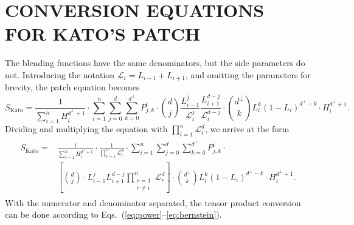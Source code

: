 \documentclass[9pt,academicons]{article}
\begin{document}
\section{CONVERSION EQUATIONS FOR KATO'S PATCH}
\label{app:kato}
The blending functions have the same denominators, but the side parameters do not.
Introducing the notation $\mathcal{L}_i=L_{i-1}+L_{i+1}$, and omitting the
parameters for brevity, the patch equation becomes
\begin{equation}
  S_\mathrm{Kato}=
  \frac{1}{\sum_{i=1}^nH_i^{d^\perp+1}}\cdot
  \sum_{i=1}^n\sum_{j=0}^d\sum_{k=0}^{d^\perp}
  P_{j,k}^i\cdot
  {d\choose j}\frac{L_{i-1}^j}{\mathcal{L}_i^j}\frac{L_{i+1}^{d-j}}{\mathcal{L}_i^{d-j}}\cdot
  {d^\perp\choose k}L_i^k(1-L_i)^{d^\perp-k}
  \cdot H_i^{d^\perp+1}.
\end{equation}
Dividing and multiplying the equation with $\prod_{i=1}^n\mathcal{L}_i^d$, we arrive at the form
\begin{align}
  \begin{split}
    S_\mathrm{Kato}=
    &\frac{1}{\sum_{i=1}^nH_i^{d^\perp+1}}\cdot
    \frac{1}{\prod_{i=1}^n\mathcal{L}_i^d}\cdot
    \sum_{i=1}^n\sum_{j=0}^d\sum_{k=0}^{d^\perp}
    P_{j,k}^i\cdot\\
    &\left[{d\choose j}\cdot L_{i-1}^jL_{i+1}^{d-j}\prod_{\substack{r=1\\r\neq i}}^n\mathcal{L}_r^d\right]
    \cdot {d^\perp\choose k}L_i^k(1-L_i)^{d^\perp-k}
    \cdot H_i^{d^\perp+1}.
  \end{split}
\end{align}
With the numerator and denominator separated, the tensor product conversion can be done
according to Eqs.~(\ref{eq:power}--\ref{eq:bernstein}).
\end{document}
